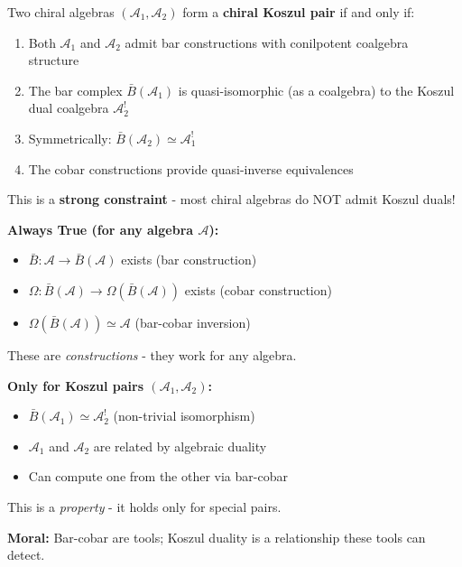 \begin{definition}\label{def:koszul-criteria}
Two chiral algebras $(\mathcal{A}_1, \mathcal{A}_2)$ form a \textbf{chiral Koszul pair} if and only if:
\begin{enumerate}
\item Both $\mathcal{A}_1$ and $\mathcal{A}_2$ admit bar constructions with conilpotent coalgebra structure
\item The bar complex $\bar{B}(\mathcal{A}_1)$ is quasi-isomorphic (as a coalgebra) to the Koszul dual coalgebra $\mathcal{A}_2^!$
\item Symmetrically: $\bar{B}(\mathcal{A}_2) \simeq \mathcal{A}_1^!$
\item The cobar constructions provide quasi-inverse equivalences
\end{enumerate}

This is a \textbf{strong constraint} - most chiral algebras do NOT admit Koszul duals!
\end{definition}

\begin{remark}\label{rem:fundamental-distinction}
\textbf{Always True (for any algebra $\mathcal{A}$):}
\begin{itemize}
\item $\bar{B}: \mathcal{A} \to \bar{B}(\mathcal{A})$ exists (bar construction)
\item $\Omega: \bar{B}(\mathcal{A}) \to \Omega(\bar{B}(\mathcal{A}))$ exists (cobar construction)
\item $\Omega(\bar{B}(\mathcal{A})) \simeq \mathcal{A}$ (bar-cobar inversion)
\end{itemize}

These are \textit{constructions} - they work for any algebra.

\textbf{Only for Koszul pairs $(\mathcal{A}_1, \mathcal{A}_2)$:}
\begin{itemize}
\item $\bar{B}(\mathcal{A}_1) \simeq \mathcal{A}_2^!$ (non-trivial isomorphism)
\item $\mathcal{A}_1$ and $\mathcal{A}_2$ are related by algebraic duality
\item Can compute one from the other via bar-cobar
\end{itemize}

This is a \textit{property} - it holds only for special pairs.

\textbf{Moral:} Bar-cobar are tools; Koszul duality is a relationship these tools can detect.
\end{remark}

